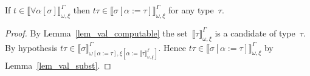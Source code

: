 \documentclass[runningheads,a4paper]{llncs}
\newcommand{\subst}[2]{#1:=#2}
\newcommand{\SN}{\mathrm{SN}}
\newcommand{\Cb}{\mathbb{C}}
\newcommand{\val}[3]{\ensuremath{\llbracket#1\rrbracket_{#2}^{#3}}}
\begin{document}
%
%

\begin{lemma}
  If $t \in \val{\forall\alpha[\sigma]}{\omega,\xi}{\Gamma}$ then
  $t \tau \in \val{\sigma[\subst{\alpha}{\tau}]}{\omega,\xi}{\Gamma}$
  for any type~$\tau$.
\end{lemma}

\begin{proof}
  By Lemma~\ref{lem_val_computable} the
  set~$\val{\tau}{\omega,\xi}{\Gamma}$ is a candidate of
  type~$\tau$. By hypothesis
  $t \tau \in
  \val{\sigma}{\omega[\subst{\alpha}{\tau}],\xi[\subst{\alpha}{\val{\tau}{\omega,\xi}{\Gamma}}]}{\Gamma}$. Hence
  $t \tau \in \val{\sigma[\subst{\alpha}{\tau}]}{\omega,\xi}{\Gamma}$
  by Lemma~\ref{lem_val_subst}.
\end{proof}
\end{document}
